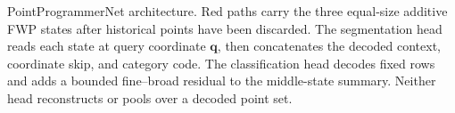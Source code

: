 \caption{PointProgrammerNet architecture. Red paths carry the three equal-size additive FWP states after historical points have been discarded. The segmentation head reads each state at query coordinate $\bm q$, then concatenates the decoded context, coordinate skip, and category code. The classification head decodes fixed rows and adds a bounded fine--broad residual to the middle-state summary. Neither head reconstructs or pools over a decoded point set.}
\label{fig:architecture}
